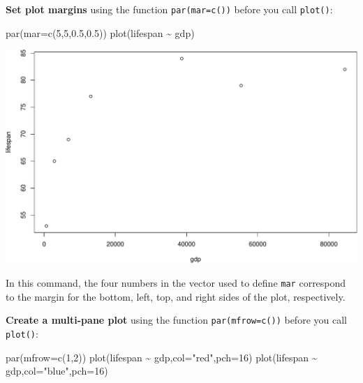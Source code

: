 \documentclass[
]{book}
\newenvironment{Shaded}{\begin{snugshade}}{\end{snugshade}}
\newcommand{\AttributeTok}[1]{\textcolor[rgb]{0.77,0.63,0.00}{#1}}
\newcommand{\DecValTok}[1]{\textcolor[rgb]{0.00,0.00,0.81}{#1}}
\newcommand{\FloatTok}[1]{\textcolor[rgb]{0.00,0.00,0.81}{#1}}
\newcommand{\FunctionTok}[1]{\textcolor[rgb]{0.00,0.00,0.00}{#1}}
\newcommand{\NormalTok}[1]{#1}
\newcommand{\SpecialCharTok}[1]{\textcolor[rgb]{0.00,0.00,0.00}{#1}}
\newcommand{\StringTok}[1]{\textcolor[rgb]{0.31,0.60,0.02}{#1}}
\begin{document}
\textbf{Set plot margins} using the function \texttt{par(mar=c())} before you call \texttt{plot()}:

\begin{Shaded}
\begin{Highlighting}[]
\FunctionTok{par}\NormalTok{(}\AttributeTok{mar=}\FunctionTok{c}\NormalTok{(}\DecValTok{5}\NormalTok{,}\DecValTok{5}\NormalTok{,}\FloatTok{0.5}\NormalTok{,}\FloatTok{0.5}\NormalTok{))}
\FunctionTok{plot}\NormalTok{(lifespan }\SpecialCharTok{\textasciitilde{}}\NormalTok{ gdp)}
\end{Highlighting}
\end{Shaded}

\includegraphics{figures/unnamed-chunk-109-1.pdf}

In this command, the four numbers in the vector used to define \texttt{mar} correspond to the margin for the bottom, left, top, and right sides of the plot, respectively.

\textbf{Create a multi-pane plot} using the function \texttt{par(mfrow=c())} before you call \texttt{plot()}:

\begin{Shaded}
\begin{Highlighting}[]
\FunctionTok{par}\NormalTok{(}\AttributeTok{mfrow=}\FunctionTok{c}\NormalTok{(}\DecValTok{1}\NormalTok{,}\DecValTok{2}\NormalTok{))}
\FunctionTok{plot}\NormalTok{(lifespan }\SpecialCharTok{\textasciitilde{}}\NormalTok{ gdp,}\AttributeTok{col=}\StringTok{"red"}\NormalTok{,}\AttributeTok{pch=}\DecValTok{16}\NormalTok{)}
\FunctionTok{plot}\NormalTok{(lifespan }\SpecialCharTok{\textasciitilde{}}\NormalTok{ gdp,}\AttributeTok{col=}\StringTok{"blue"}\NormalTok{,}\AttributeTok{pch=}\DecValTok{16}\NormalTok{)}
\end{Highlighting}
\end{Shaded}
\end{document}

